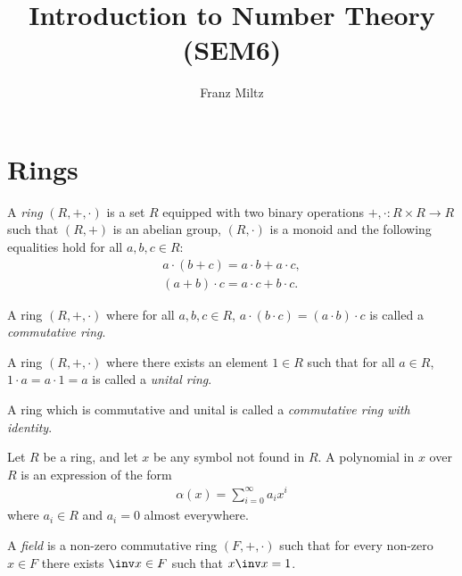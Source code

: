 \documentclass{article}
\begin{document}
\mkthmstwounified
\title{Introduction to Number Theory (SEM6)}
\author{Franz Miltz}
\maketitle
\tableofcontents
\pagebreak

\section{Rings}

\begin{definition}[Ring]
	A \emph{ring} $(R,+,\cdot)$ is a set $R$ equipped with two binary operations
	$+,\cdot:R\times R\to R$ such that $(R,+)$ is an abelian group, $(R,\cdot)$
	is a monoid and the following equalities hold for all $a,b,c\in R$:
	\begin{align*}
		a       \cdot (b + c)   = a \cdot b + a \cdot c, \\
		(a+b)   \cdot c         = a \cdot c + b \cdot c.
	\end{align*}
\end{definition}

\begin{definition}
	A ring $(R,+,\cdot)$ where for all $a,b,c\in R$, $a\cdot(b\cdot c) = (a\cdot b)\cdot c$
	is called a \emph{commutative ring}.
\end{definition}

\begin{definition}
	A ring $(R,+,\cdot)$ where there exists an element $1\in R$ such that
	for all $a\in R$, $1\cdot a = a \cdot 1 = a$ is called a \emph{unital ring}.
\end{definition}

\begin{definition}
	A ring which is commutative and unital is called a \emph{commutative ring
		with identity}.
\end{definition}

\begin{definition}
	Let $R$ be a ring, and let $x$ be any symbol not found in $R$. A polynomial in $x$ over $R$
	is an expression of the form
	\begin{align*}
		\alpha(x)=\sum_{i=0}^\infty a_ix^i
	\end{align*}
	where $a_i\in R$ and $a_i=0$ almost everywhere.
\end{definition}

\begin{definition}
	A \emph{field} is a non-zero commutative ring $(F, +, \cdot)$ such that for every non-zero
	$x\in F$ there exists $\inv x\in F$ such that $x\inv x = 1$.
\end{definition}
\end{document}
